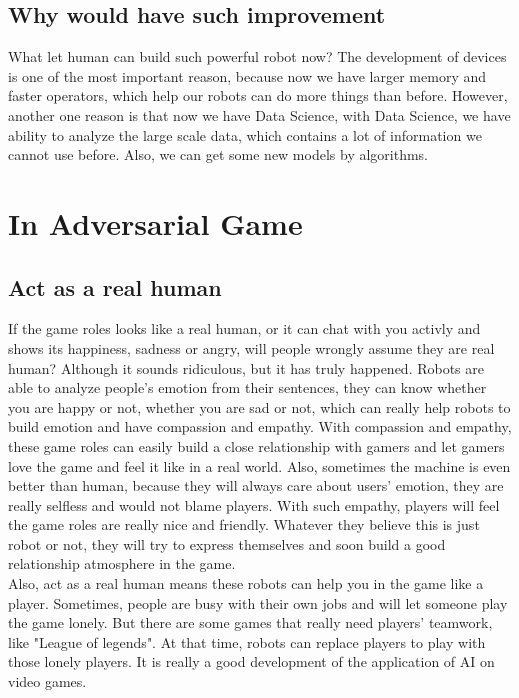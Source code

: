 \documentclass[12pt]{article}
\begin{document}
        \subsection{Why would have such improvement}
            What let human can build such powerful robot now? The development of devices is one of the
            most important reason, because now we have larger memory and faster operators, which
            help our robots can do more things than before. However, another one reason is that
            now we have Data Science, with Data Science, we have ability to analyze the large scale
            data, which contains a lot of information we cannot use before. Also, we can get some
            new models by algorithms.
    \section{In Adversarial Game}
        \subsection{Act as a real human}
            If the game roles looks like a real human, or it can chat with you activly and shows its
            happiness, sadness or angry, will people wrongly assume they are real human? Although it
            sounds ridiculous, but it has truly happened. Robots are able to analyze people's emotion
            from their sentences, they can know whether you are happy or not, whether you are sad or
            not, which can really help robots to build emotion and have compassion and empathy. With
            compassion and empathy, these game roles can easily build a close relationship with gamers
            and let gamers love the game and feel it like in a real world. Also, sometimes the machine
            is even better than human, because they will always care about users' emotion, they are
            really selfless and would not blame players. With such empathy, players will feel the
            game roles are really nice and friendly. Whatever they believe this is just robot or not,
            they will try to express themselves and soon build a good relationship atmosphere in the
            game.\\

            Also, act as a real human means these robots can help you in the game like a player.
            Sometimes, people are busy with their own jobs and will let someone play the game lonely.
            But there are some games that really need players' teamwork, like "League of legends".
            At that time, robots can replace players to play with those lonely players. It is really
            a good development of the application of AI on video games.
\end{document}

